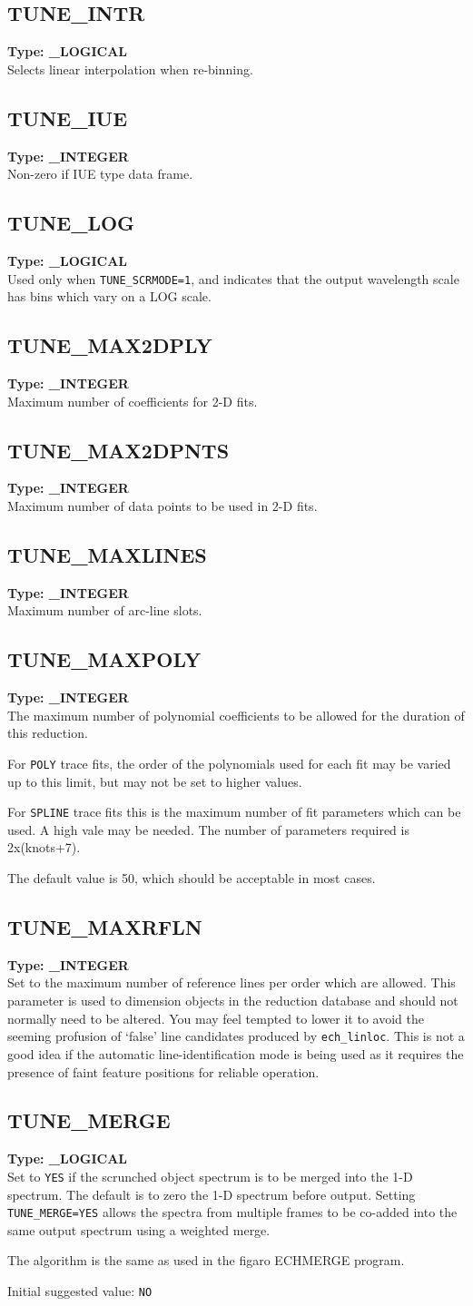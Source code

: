 \documentclass[11pt,twoside]{article}
\makeatletter
\newcommand{\htmlref}[2]{#1}
\newcommand{\xref}[3]{#1}
\newcommand{\xlabel}[1]{}
\newcommand{\sunspec}[2]{#1}
\renewcommand{\sunspec}[2]{#2}
\newcommand{\indexcmdname}[1]{\index{#1@\protect\cmdname{#1}}}
\renewcommand{\indexcmdname}[1]{}
\newcommand{\cmdname}{\begingroup \catcode`\_=12 \realcmdname}
\newcommand{\realcmdname}[1]{\endgroup\texttt{#1}}
\newcommand{\echparameter}[4]
{
\item [#1 = #3] \mbox{}\label{par_#2}\indexcmdname{#2}
\\
#4
}
\renewcommand{\echparameter}[4]
{
  \subsection{\xlabel{par_#2}\label{par_#2}{\bf #1}}
  {\bf Type: #3}\\
#4
}
\makeatother
\begin{document}
\echparameter{TUNE\_INTR}{TUNE_INTR}{
 \_LOGICAL
}{
 Selects linear interpolation when re-binning.
}

\echparameter{TUNE\_IUE}{TUNE_IUE}{
 \_INTEGER
}{
 Non-zero if IUE type data frame.
}

\echparameter{TUNE\_LOG}{TUNE_LOG}{
 \_LOGICAL
}{
 Used only when \htmlref{{\tt TUNE\_SCRMODE=1}}{par_TUNE_SCRMODE},
 and indicates that the output
 wavelength scale has bins which vary on a LOG scale.
}

\echparameter{TUNE\_MAX2DPLY}{TUNE_MAX2DPLY}{
 \_INTEGER
}{
 Maximum number of coefficients for 2-D fits.
}

\echparameter{TUNE\_MAX2DPNTS}{TUNE_MAX2DPNTS}{
 \_INTEGER
}{
 Maximum number of data points to be used in 2-D fits.
}

\echparameter{TUNE\_MAXLINES}{TUNE_MAXLINES}{
 \_INTEGER
}{
 Maximum number of arc-line slots.
}

\echparameter{TUNE\_MAXPOLY}{TUNE_MAXPOLY}{
 \_INTEGER
}{
 The maximum number of polynomial coefficients to be allowed for the
 duration of this reduction.

 For \texttt{POLY} trace fits, the order of the polynomials used for each fit
 may be varied up to this limit, but may not be set to higher values.

 For \texttt{SPLINE} trace fits this is the maximum number of fit parameters
 which can be used.  A high vale may be needed.  The number of
 parameters required is \sunspec{(knots+7)$\times$2}{2x(knots+7)}.

 The default value is 50, which should be acceptable in most cases.
}

\echparameter{TUNE\_MAXRFLN}{TUNE_MAXRFLN}{
 \_INTEGER
}{
 Set to the maximum number of reference lines per order which are
 allowed.  This parameter is used to dimension objects in the
 reduction database and should not normally need to be
 altered.  You may feel tempted to lower it to avoid the
 seeming profusion of `false' line candidates produced by
 \htmlref{{\tt ech\_linloc}}{ech_linloc}.  This is not a good idea
 if the automatic line-identification mode is being used as it requires the
 presence of faint feature positions for reliable operation.
}

\echparameter{TUNE\_MERGE}{TUNE_MERGE}{
 \_LOGICAL
}{
 Set to \texttt{YES} if the scrunched object spectrum is to be merged into
 the 1-D spectrum.  The default is to zero the 1-D spectrum before
 output.  Setting {\tt TUNE\_MERGE=YES} allows the spectra from multiple
 frames to be co-added into the same output spectrum using a
 weighted merge.

 The algorithm is the same as used in the
 \xref{{\sc figaro}}{sun86}{} \xref{ECHMERGE}{sun86}{ECHMERGE} program.

 Initial suggested value: \texttt{NO}
}
\end{document}
